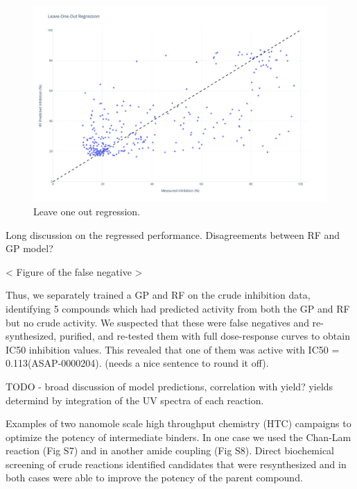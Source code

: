 \begin{figure}
    \centering
             \includegraphics[width=\textwidth]{Chapters/Crude/Figs/rf.pdf}
        \caption{Leave one out regression.}
        \label{fig:leave-one-out}
    \end{figure}

Long discussion on the regressed performance. Disagreements between RF and GP model?

< Figure of the false negative >

Thus, we separately trained a GP and RF on the crude inhibition data, identifying 5 compounds which had predicted activity from both the GP and RF but no crude activity. We suspected that these were false negatives and re-synthesized, purified, and re-tested them with full dose-response curves to obtain IC50 inhibition values. This revealed that one of them was active with IC50 = 0.113\uM (ASAP-0000204). (needs a nice sentence to round it off).

TODO - broad discussion of model predictions, correlation with yield?
yields determind by integration of the UV spectra of each reaction.

Examples of two nanomole scale high throughput chemistry (HTC) campaigns to optimize the potency of intermediate binders. In one case we used the Chan-Lam reaction (Fig S7) and in another amide coupling (Fig S8). Direct biochemical screening of crude reactions identified candidates that were resynthesized and in both cases were able to improve the potency of the parent compound.

